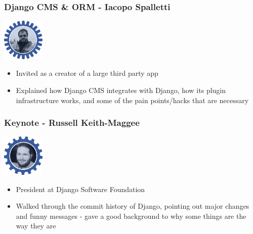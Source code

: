 \documentclass{beamer}
\begin{document}
\begin{frame}[fragile]\frametitle{Django CMS \& ORM - Iacopo Spalletti}

    \begin{center}
        \includegraphics[width=2cm]{speaker-iacopo}
    \end{center}

    \begin{itemize}
        \item Invited as a creator of a large third party app
        \item Explained how Django CMS integrates with Django, how its plugin infrastructure works, and some of the pain points/hacks that are necessary
    \end{itemize}

\end{frame}


\begin{frame}[fragile]\frametitle{Keynote - Russell Keith-Maggee}

    \begin{center}
        \includegraphics[width=2cm]{speaker-russ}
    \end{center}

    \begin{itemize}
        \item President at Django Software Foundation
        \item Walked through the commit history of Django, pointing out major changes and funny messages - gave a good background to why some things are the way they are
    \end{itemize}

\end{frame}
\end{document}
